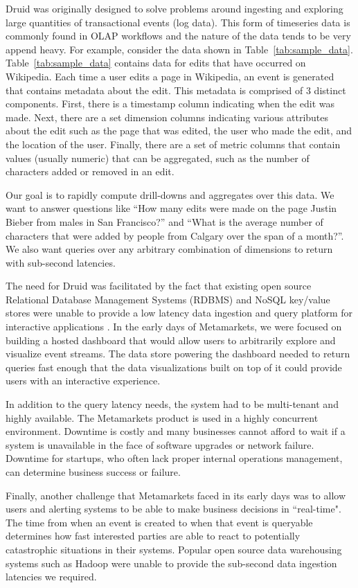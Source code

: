 \documentclass{sig-alternate-2013}
\begin{document}
Druid was originally designed to solve problems around ingesting and exploring
large quantities of transactional events (log data). This form of timeseries
data is commonly found in OLAP workflows and the nature of the data tends to be
very append heavy. For example, consider the data shown in
Table~\ref{tab:sample_data}. Table~\ref{tab:sample_data} contains data for
edits that have occurred on Wikipedia. Each time a user edits a page in
Wikipedia, an event is generated that contains metadata about the edit. This
metadata is comprised of 3 distinct components. First, there is a timestamp
column indicating when the edit was made. Next, there are a set dimension
columns indicating various attributes about the edit such as the page that was
edited, the user who made the edit, and the location of the user. Finally,
there are a set of metric columns that contain values (usually numeric) that
can be aggregated, such as the number of characters added or removed in an
edit.

Our goal is to rapidly compute drill-downs and aggregates over this data. We
want to answer questions like “How many edits were made on the page Justin
Bieber from males in San Francisco?” and “What is the average number of
characters that were added by people from Calgary over the span of a month?”. We also
want queries over any arbitrary combination of dimensions to return with
sub-second latencies.

The need for Druid was facilitated by the fact that existing open source
Relational Database Management Systems (RDBMS) and NoSQL key/value stores were
unable to provide a low latency data ingestion and query platform for
interactive applications \cite{tschetter2011druid}. In the early days of
Metamarkets, we were focused on building a hosted dashboard that would allow
users to arbitrarily explore and visualize event streams. The data store
powering the dashboard needed to return queries fast enough that the data
visualizations built on top of it could provide users with an interactive
experience.

In addition to the query latency needs, the system had to be multi-tenant and
highly available. The Metamarkets product is used in a highly concurrent
environment. Downtime is costly and many businesses cannot afford to wait if a
system is unavailable in the face of software upgrades or network failure.
Downtime for startups, who often lack proper internal operations management, can
determine business success or failure.

Finally, another challenge that Metamarkets faced in its early days was to
allow users and alerting systems to be able to make business decisions in
``real-time". The time from when an event is created to when that event is
queryable determines how fast interested parties are able to react to
potentially catastrophic situations in their systems. Popular open source data
warehousing systems such as Hadoop were unable to provide the sub-second data
ingestion latencies we required.
\end{document}
